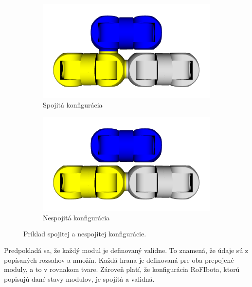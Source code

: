 \documentclass[
  digital, %
  oneside, %
  table,   %
  lof,     %
  nolot,     %
]{fithesis3}
\begin{document}
\begin{figure}[hbt!]
    \centering
    \begin{subfigure}[b]{0.49\textwidth}
        \includegraphics[width=\textwidth]{pictures/connected_rofibot.png}
        \caption[Spojitá konfigurácia.]{Spojitá konfigurácia}
        \label{fig:connectCfg}
    \end{subfigure}
    \begin{subfigure}[b]{0.49\textwidth}
        \includegraphics[width=\textwidth]{pictures/disconnected_rofibot.png}
        \caption[Nespojitá konfigurácia.]{Nespojitá konfigurácia}
        \label{fig:disconnectCfg}
    \end{subfigure}
    \caption[Príklad konfigurácie]{Príklad spojitej a nespojitej konfigurácie.}
    \label{fig:exampleCfg}
\end{figure}

Predpokladá sa, že každý modul je definovaný validne. To znamená, že údaje sú z popísaných rozsahov a množín. Každá hrana je definovaná pre oba prepojené moduly, a to v rovnakom tvare. Zároveň platí, že konfigurácia RoFIbota, ktorú popisujú dané stavy modulov, je spojitá a validná. 
\end{document}

